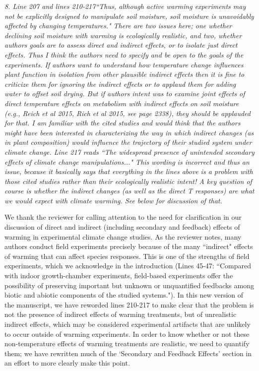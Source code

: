 \documentclass[11pt,a4paper]{letter}
\begin{document}
\begin{letter}{}
\par \emph{8. Line 207 and lines 210-217``Thus, although active warming experiments may not be explicitly designed to manipulate soil
moisture, soil moisture is unavoidably affected by changing temperatures." There are two issues here; one whether declining soil moisture with warming is ecologically
realistic, and two, whether authors goals are to assess direct and indirect effects, or to isolate
just direct effects. Thus I think the authors need to specify and be open to the goals of the
experiments. If authors want to understand how temperature change influences plant function
in isolation from other plausible indirect effects then it is fine to criticize them for ignoring the
indirect effects or to applaud them for adding water to offset soil drying. But if authors intent
was to examine joint effects of direct temperature effects on metabolism with indirect effects
on soil moisture (e.g., Reich et al 2015, Rich et al 2015, see page 2338), they should be
applauded for that. I am familiar with the cited studies and would think that the authors might
have been interested in characterizing the way in which indirect changes (as in plant
composition) would influence the trajectory of their studied system under climate change.
Line 217 reads ``The widespread presence of unintended secondary effects of climate change
manipulations..." This wording is incorrect and thus an issue, because it basically says that everything in the lines
above is a problem with those cited studies rather than their ecologically realistic intent! A key
question of course is whether the indirect changes (as well as the direct T responses) are what
we would expect with climate warming. See below for discussion of that.}
\\
\par We thank the reviewer for calling attention to the need for clarification in our discussion of direct and indirect (including secondary and feedback) effects of warming in experimental climate change studies. As the reviewer notes, many authors conduct field experiments precisely because of the many ``indirect" effects of warming that can affect species responses. This is one of the strengths of field experiments, which we acknowledge in the introduction (Lines 45-47: ``Compared with indoor growth-chamber experiments, field-based experiments offer the possibility of preserving important but unknown or unquantified feedbacks among biotic and abiotic components of the studied systems."). In this new version of the manuscript, we have reworded lines 210-217 to make clear that the problem is not the presence of indirect effects of warming treatments, but of unrealistic indirect effects, which may be considered experimental artifacts that are unlikely to occur outside of warming experiments. In order to know whether or not these non-temperature effects of warming treatments are realistic, we need to quantify them; we have rewritten much of the `Secondary and Feedback Effects' section in an effort to more clearly make this point.

\end{letter}
\end{document}
